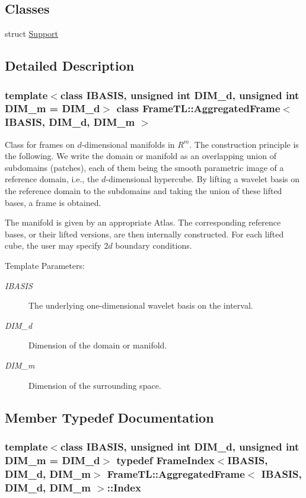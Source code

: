 \subsection*{Classes}
\begin{CompactItemize}
\item 
struct \hyperlink{structFrameTL_1_1AggregatedFrame_1_1Support}{Support}
\end{CompactItemize}


\subsection{Detailed Description}
\subsubsection*{template$<$class IBASIS, unsigned int DIM\_\-d, unsigned int DIM\_\-m = DIM\_\-d$>$ class FrameTL::AggregatedFrame$<$ IBASIS, DIM\_\-d, DIM\_\-m $>$}

Class for frames on $d$-dimensional manifolds in $R^m$. The construction principle is the following. We write the domain or manifold as an overlapping union of subdomains (patches), each of them being the smooth parametric image of a reference domain, i.e., the $d$-dimensional hypercube. By lifting a wavelet basis on the reference domain to the subdomains and taking the union of these lifted bases, a frame is obtained.

The manifold is given by an appropriate Atlas. The corresponding reference bases, or their lifted versions, are then internally constructed. For each lifted cube, the user may specify $2d$ boundary conditions.

\begin{Desc}
\item[Template Parameters:]
\begin{description}
\item[{\em IBASIS}]The underlying one-dimensional wavelet basis on the interval. \item[{\em DIM\_\-d}]Dimension of the domain or manifold. \item[{\em DIM\_\-m}]Dimension of the surrounding space. \end{description}
\end{Desc}


\subsection{Member Typedef Documentation}
\hypertarget{classFrameTL_1_1AggregatedFrame_62f05cb9f21d52568f720cde28eb124b}{
\subsubsection[Index]{\setlength{\rightskip}{0pt plus 5cm}template$<$class IBASIS, unsigned int DIM\_\-d, unsigned int DIM\_\-m = DIM\_\-d$>$ {\bf typedef} {\bf FrameIndex}$<$IBASIS, DIM\_\-d, DIM\_\-m$>$ {\bf FrameTL::AggregatedFrame}$<$ IBASIS, DIM\_\-d, DIM\_\-m $>$::{\bf Index}}}
\label{classFrameTL_1_1AggregatedFrame_62f05cb9f21d52568f720cde28eb124b}



